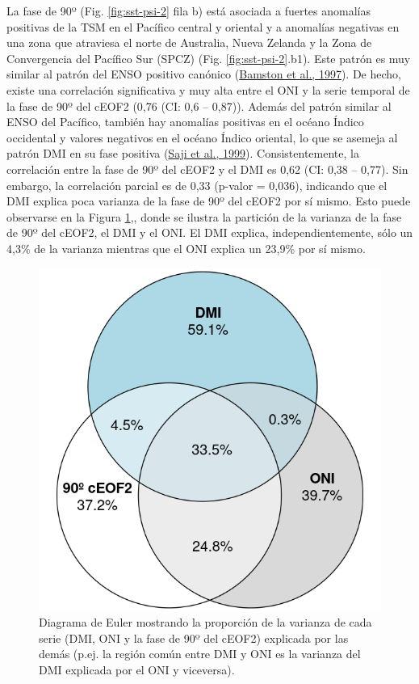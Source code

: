 \documentclass[12pt,oneside,a4paper]{reedthesis}
\begin{document}
La fase de 90º (Fig. \ref{fig:sst-psi-2} fila b) está asociada a fuertes anomalías positivas de la TSM en el Pacífico central y oriental y a anomalías negativas en una zona que atraviesa el norte de Australia, Nueva Zelanda y la Zona de Convergencia del Pacífico Sur (SPCZ) (Fig. \ref{fig:sst-psi-2}.b1).
Este patrón es muy similar al patrón del ENSO positivo canónico (\protect\hyperlink{ref-bamston1997}{Bamston et al., 1997}).
De hecho, existe una correlación significativa y muy alta entre el ONI y la serie temporal de la fase de 90º del cEOF2 (0,76 (CI: 0,6 -- 0,87)).
Además del patrón similar al ENSO del Pacífico, también hay anomalías positivas en el océano Índico occidental y valores negativos en el océano Índico oriental, lo que se asemeja al patrón DMI en su fase positiva (\protect\hyperlink{ref-saji1999}{Saji et al., 1999}).
Consistentemente, la correlación entre la fase de 90º del cEOF2 y el DMI es 0,62 (CI: 0,38 -- 0,77).
Sin embargo, la correlación parcial es de 0,33 (p-valor = 0,036), indicando que el DMI explica poca varianza de la fase de 90º del cEOF2 por sí mismo.
Esto puede observarse en la Figura \ref{fig:euler},, donde se ilustra la partición de la varianza de la fase de 90º del cEOF2, el DMI y el ONI.
El DMI explica, independientemente, sólo un 4,3\% de la varianza mientras que el ONI explica un 23,9\% por sí mismo.

\begin{figure}

{\centering \includegraphics{figures/20-ceofs/euler-1} 

}

\caption{Diagrama de Euler mostrando la proporción de la varianza de cada serie (DMI, ONI y la fase de 90º del cEOF2) explicada por las demás (p.ej. la región común entre DMI y ONI es la varianza del DMI explicada por el ONI y viceversa).}\label{fig:euler}
\end{figure}
\end{document}
